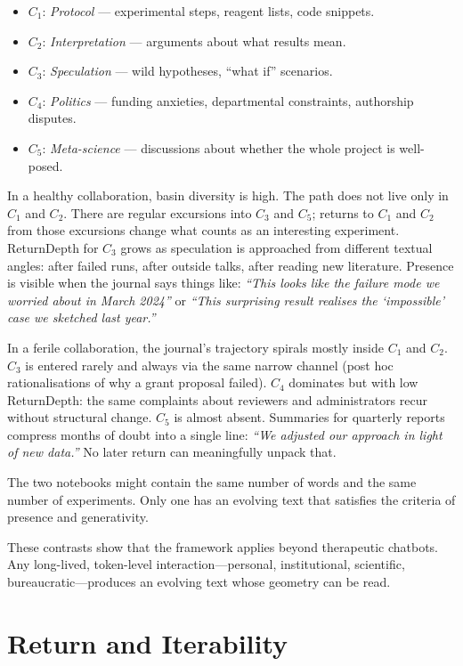 \documentclass[12pt,a4paper]{article}
\begin{document}
\begin{itemize}
  \item $C_1$: \emph{Protocol} --- experimental steps, reagent lists, code snippets.
  \item $C_2$: \emph{Interpretation} --- arguments about what results mean.
  \item $C_3$: \emph{Speculation} --- wild hypotheses, ``what if'' scenarios.
  \item $C_4$: \emph{Politics} --- funding anxieties, departmental constraints, authorship disputes.
  \item $C_5$: \emph{Meta-science} --- discussions about whether the whole project is well-posed.
\end{itemize}

In a healthy collaboration, basin diversity is high. The path does not live only in $C_1$ and $C_2$. There are regular excursions into $C_3$ and $C_5$; returns to $C_1$ and $C_2$ from those excursions change what counts as an interesting experiment. ReturnDepth for $C_3$ grows as speculation is approached from different textual angles: after failed runs, after outside talks, after reading new literature. Presence is visible when the journal says things like: \emph{``This looks like the failure mode we worried about in March 2024''} or \emph{``This surprising result realises the `impossible' case we sketched last year.''}

In a ferile collaboration, the journal's trajectory spirals mostly inside $C_1$ and $C_2$. $C_3$ is entered rarely and always via the same narrow channel (post hoc rationalisations of why a grant proposal failed). $C_4$ dominates but with low ReturnDepth: the same complaints about reviewers and administrators recur without structural change. $C_5$ is almost absent. Summaries for quarterly reports compress months of doubt into a single line: \emph{``We adjusted our approach in light of new data.''} No later return can meaningfully unpack that.

The two notebooks might contain the same number of words and the same number of experiments. Only one has an evolving text that satisfies the criteria of presence and generativity.

These contrasts show that the framework applies beyond therapeutic chatbots. Any long-lived, token-level interaction---personal, institutional, scientific, bureaucratic---produces an evolving text whose geometry can be read.


\section{Return and Iterability}
\end{document}
